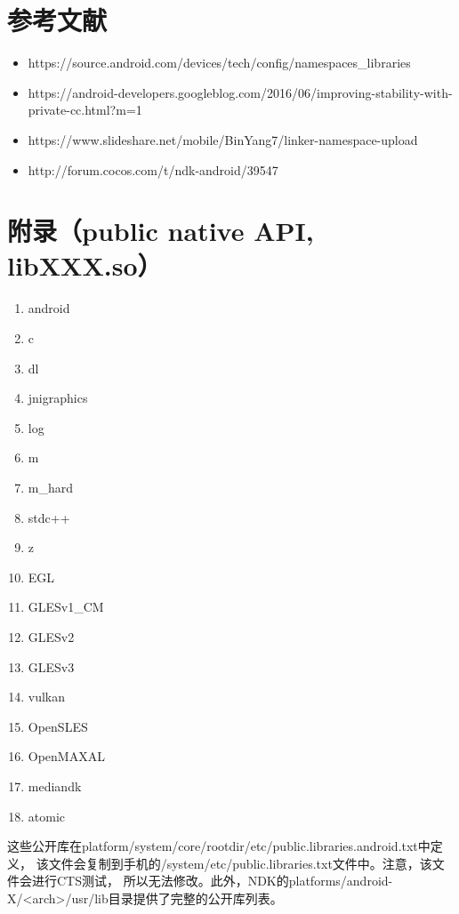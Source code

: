 \documentclass[a4paper,11pt]{article}
\begin{document}
\section[参考文献]{参考文献}
\begin{itemize}
  \item https://source.android.com/devices/tech/config/namespaces_libraries
  \item https://android-developers.googleblog.com/2016/06/improving-stability-with-private-cc.html?m=1
  \item https://www.slideshare.net/mobile/BinYang7/linker-namespace-upload
  \item http://forum.cocos.com/t/ndk-android/39547
\end{itemize}

\section[附录]{附录（public native API, libXXX.so）}
\begin{enumerate}
    \item android
    \item c
    \item dl
    \item jnigraphics
    \item log
    \item m
    \item m_hard
    \item stdc++
    \item z
    \item EGL
    \item GLESv1_CM
    \item GLESv2
    \item GLESv3
    \item vulkan
    \item OpenSLES
    \item OpenMAXAL
    \item mediandk
    \item atomic
\end{enumerate}

这些公开库在platform/system/core/rootdir/etc/public.libraries.android.txt中定义，
该文件会复制到手机的/system/etc/public.libraries.txt文件中。注意，该文件会进行CTS测试，
所以无法修改。此外，NDK的platforms/android-X/<arch>/usr/lib目录提供了完整的公开库列表。
\end{document}
